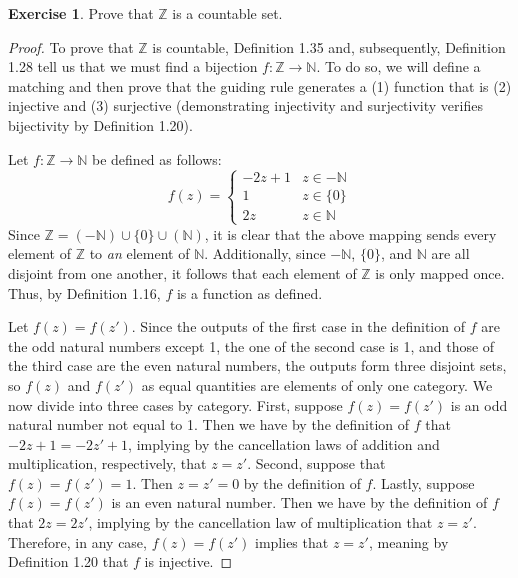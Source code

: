 \documentclass[titlepage]{article}
\newcounter{script}
\theoremstyle{definition}
\newtheorem{exercise}{Exercise}[script]
\newcommand{\N}{\mathbb{N}}
\newcommand{\Z}{\mathbb{Z}}
\begin{document}

\begin{exercise}
    Prove that $\Z$ is a countable set.
    \begin{proof}
        To prove that $\Z$ is countable, Definition 1.35 and, subsequently, Definition 1.28 tell us that we must find a bijection $f:\Z\to\N$. To do so, we will define a matching and then prove that the guiding rule generates a (1) function that is (2) injective and (3) surjective (demonstrating injectivity and surjectivity verifies bijectivity by Definition 1.20).\par
        Let $f:\Z\to\N$ be defined as follows:
        \begin{equation*}
            f(z) =
            \begin{cases}
                -2z+1 & z\in-\N\\
                1 & z\in\{0\}\\
                2z & z\in\N
            \end{cases}
        \end{equation*}
        Since $\Z=(-\N)\cup\{0\}\cup(\N)$, it is clear that the above mapping sends every element of $\Z$ to \emph{an} element of $\N$. Additionally, since $-\N$, $\{0\}$, and $\N$ are all disjoint from one another, it follows that each element of $\Z$ is only mapped once. Thus, by Definition 1.16, $f$ is a function as defined.\par
        Let $f(z)=f(z')$. Since the outputs of the first case in the definition of $f$ are the odd natural numbers except 1, the one of the second case is 1, and those of the third case are the even natural numbers, the outputs form three disjoint sets, so $f(z)$ and $f(z')$ as equal quantities are elements of only one category. We now divide into three cases by category. First, suppose $f(z)=f(z')$ is an odd natural number not equal to 1. Then we have by the definition of $f$ that $-2z+1=-2z'+1$, implying by the cancellation laws of addition and multiplication, respectively, that $z=z'$. Second, suppose that $f(z)=f(z')=1$. Then $z=z'=0$ by the definition of $f$. Lastly, suppose $f(z)=f(z')$ is an even natural number. Then we have by the definition of $f$ that $2z=2z'$, implying by the cancellation law of multiplication that $z=z'$. Therefore, in any case, $f(z)=f(z')$ implies that $z=z'$, meaning by Definition 1.20 that $f$ is injective.\par

\end{proof}
\end{exercise}
\end{document}
